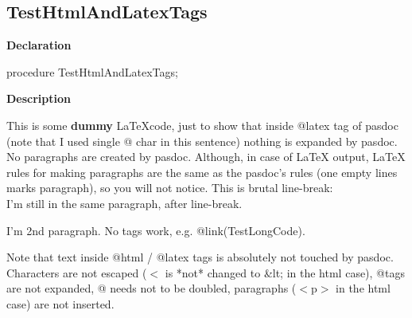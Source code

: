 \documentclass{report}
\begin{document}
\subsection*{TestHtmlAndLatexTags}
\begin{list}{}{
\setlength{\itemindent}{0cm}
\setlength{\listparindent}{0cm}
\setlength{\leftmargin}{\evensidemargin}
\addtolength{\leftmargin}{\tmplength}
\settowidth{\labelsep}{X}
\addtolength{\leftmargin}{\labelsep}
\setlength{\labelwidth}{\tmplength}
}
\begin{flushleft}
\item[\textbf{Declaration}\hfill]
\begin{ttfamily}
procedure TestHtmlAndLatexTags;\end{ttfamily}


\end{flushleft}
\par
\item[\textbf{Description}]



    This is some {\bf dummy} \LaTeX code, just to show that inside
    @latex tag of pasdoc (note that I used single @ char in this sentence)
    nothing is expanded by pasdoc.
    No paragraphs are created by pasdoc. Although, in case of LaTeX output,
    LaTeX rules for making paragraphs are the same as the pasdoc's rules
    (one empty lines marks paragraph), so you will not notice.
    This is brutal line-break: \\
    I'm still in the same paragraph, after line-break.

    I'm 2nd paragraph.
    No tags work, e.g. @link(TestLongCode).
  

Note that text inside @html / @latex tags is absolutely not touched by pasdoc. Characters are not escaped ({$<$} is *not* changed to {\&}lt; in the html case), @tags are not expanded, @ needs not to be doubled, paragraphs ({$<$}p{$>$} in the html case) are not inserted.

\end{list}
\end{document}
